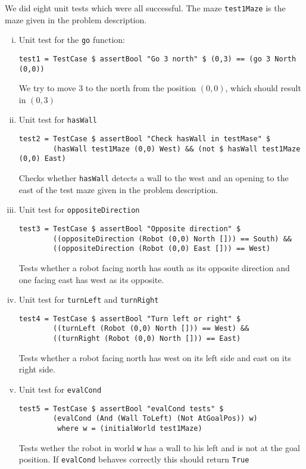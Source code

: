 \documentclass[a4paper,10pt]{article}
\begin{document}
We did eight unit tests which were all successful. The maze \verb=test1Maze= is the maze given in the problem description.
\begin{enumerate}[i.]
\item Unit test for the \verb=go= function:
\begin{verbatim}
test1 = TestCase $ assertBool "Go 3 north" $ (0,3) == (go 3 North (0,0))
\end{verbatim}
We try to move 3 to the north from the position $(0,0)$, which should result in $(0,3)$

\item Unit test for \verb=hasWall=
\begin{verbatim}
test2 = TestCase $ assertBool "Check hasWall in testMase" $ 
        (hasWall test1Maze (0,0) West) && (not $ hasWall test1Maze (0,0) East)
\end{verbatim}
Checks whether \verb=hasWall= detects a wall to the west and an opening to the east of the test maze given in the problem description.

\item Unit test for \verb=oppositeDirection=
\begin{verbatim}
test3 = TestCase $ assertBool "Opposite direction" $ 
        ((oppositeDirection (Robot (0,0) North [])) == South) && 
        ((oppositeDirection (Robot (0,0) East [])) == West)
\end{verbatim}
Tests whether a robot facing north has south as its opposite direction and one facing east has west as its opposite.

\item Unit test for \verb=turnLeft= and \verb=turnRight=
\begin{verbatim}
test4 = TestCase $ assertBool "Turn left or right" $ 
        ((turnLeft (Robot (0,0) North [])) == West) && 
        ((turnRight (Robot (0,0) North [])) == East)
\end{verbatim}
Tests whether a robot facing north has west on its left side and east on its right side.

\item Unit test for \verb=evalCond=
\begin{verbatim}
test5 = TestCase $ assertBool "evalCond tests" $ 
        (evalCond (And (Wall ToLeft) (Not AtGoalPos)) w)
         where w = (initialWorld test1Maze)
\end{verbatim}
Tests wether the robot in world \verb=w= has a wall to his left and is not at the goal position. If \verb=evalCond= behaves correctly this should return \verb=True=


\end{enumerate}
\end{document}
